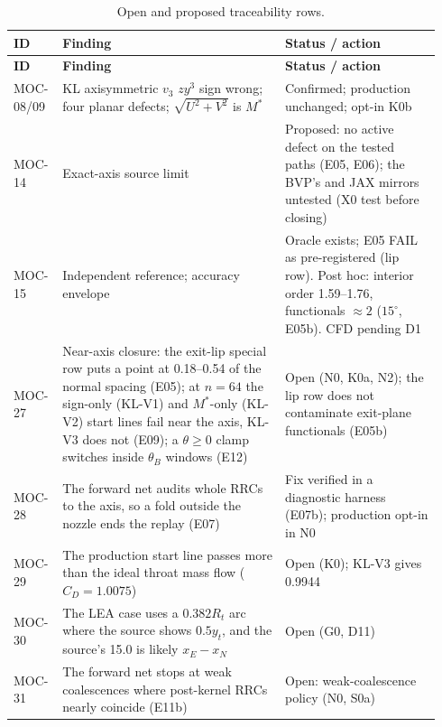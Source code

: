 \begingroup\footnotesize\renewcommand{\LTcaptype}{table}
\begin{longtable}{@{}P{0.09\linewidth}P{0.50\linewidth}P{0.35\linewidth}@{}}
\caption{Open and proposed traceability rows.}\label{tab:new-rows}\\
\toprule\textbf{ID} & \textbf{Finding} & \textbf{Status / action}\\\midrule
\endfirsthead
\toprule\textbf{ID} & \textbf{Finding} & \textbf{Status / action}\\\midrule
\endhead
MOC-08/09 & KL axisymmetric $v_3$ $zy^3$ sign wrong; four planar defects; $\sqrt{U^2+V^2}$ is $M^*$ & Confirmed; production unchanged; opt-in K0b\\
MOC-14 & Exact-axis source limit & Proposed: no active defect on the tested paths (E05, E06); the BVP's  and JAX mirrors untested (X0 test before closing)\\
MOC-15 & Independent reference; accuracy envelope & Oracle exists; E05 FAIL as pre-registered (lip row). Post hoc: interior order 1.59--1.76, functionals $\approx2$ ($15^\circ$, E05b). CFD pending D1\\
MOC-27 & Near-axis closure: the exit-lip special row puts a point at 0.18--0.54 of the normal spacing (E05); at $n=64$ the sign-only (KL-V1) and $M^*$-only (KL-V2) start lines fail near the axis, KL-V3 does not (E09); a $\theta\ge0$ clamp switches inside $\theta_B$ windows (E12) & Open (N0, K0a, N2); the lip row does not contaminate exit-plane functionals (E05b)\\
MOC-28 & The forward net audits whole RRCs to the axis, so a fold outside the nozzle ends the replay (E07) & Fix verified in a diagnostic harness (E07b); production opt-in in N0\\
MOC-29 & The production start line passes more than the ideal throat mass flow ($C_D=1.0075$) & Open (K0); KL-V3 gives 0.9944\\
MOC-30 & The LEA case uses a $0.382R_t$ arc where the source shows $0.5y_t$, and the source's 15.0 is likely $x_E-x_N$ & Open (G0, D11)\\
MOC-31 & The forward net stops at weak coalescences where post-kernel RRCs nearly coincide (E11b) & Open: weak-coalescence policy (N0, S0a)\\
\bottomrule
\end{longtable}
\endgroup
